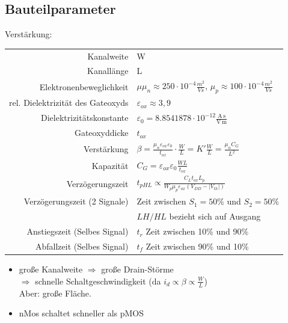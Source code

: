 \documentclass[6pt,a4paper]{scrartcl}
\newcommand{\Ra}[0]{\ensuremath{\Rightarrow}}									%
\begin{document}
\begin{multicols*}{3}
	\subsection{Bauteilparameter}
	Verstärkung:  \\
	\begin{tabular} {r | l}
		Kanalweite & W  \\
		Kanallänge & L  \\
		Elektronenbeweglichkeit & $\mu$\quad $\mu_n \approx 250 \cdot 10^{-4} \frac{m^2}{Vs}$, $\mu_p \approx 100 \cdot 10^{-4} \frac{m^2}{Vs}$ \\
		rel. Dielektrizität des Gateoxyds & $\varepsilon_{ox} \approx 3,9$ \\
		Dielektrizitätskonstante & $\varepsilon_0 = 8.8541878 \cdot 10^{-12} \frac{\mathrm{A\,s}}{\mathrm{V\,m}}$ \\
		Gateoxyddicke & $t_{ox}$ \\
		Verstärkung & $\beta = \frac{\mu_n \varepsilon_{ox} \varepsilon_0}{t_{ox}} \cdot \frac{W}{L} = K' \frac{W}{L} = \frac{\mu_n C_G}{L^2}$ \\
		Kapazität & $C_G = \varepsilon_{ox} \varepsilon_0 \frac{WL}{t_{ox}}$ \\
		Verzögerungszeit & $t_{pHL} \propto \frac{C_L t_{ox} L_p}{W_p \mu_p \varepsilon_{ox} (V_{DD} - |V_{th}|)}$ \\
		Verzögerungszeit (2 Signale) & Zeit zwischen $S_1=50\% $ und $S_2=50\% $\\
		& $LH/HL$ bezieht sich auf Ausgang \\
		Anstiegszeit (Selbes Signal) & $t_{r}$ Zeit zwischen 10\% und 90\% \\
		Abfallzeit (Selbes Signal) & $t_{f}$ Zeit zwischen 90\% und 10\% \\
	\end{tabular}
	\begin{itemize}
		\item große Kanalweite $\Ra$ große Drain-Störme \\ $\Ra$ schnelle Schaltgeschwindigkeit (da $i_d \propto \beta \propto \frac{W}{L}$) \\
		Aber: große Fläche.
		\item nMos schaltet schneller als pMOS
	\end{itemize}


\end{multicols*}
\end{document}
